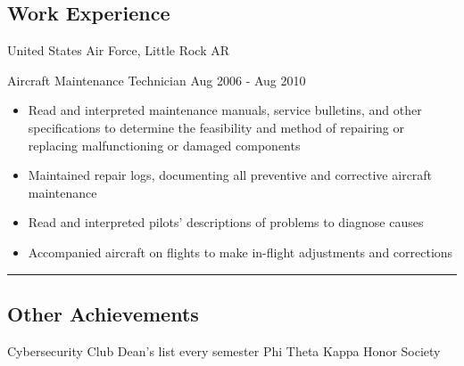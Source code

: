 \documentclass{article}
\begin{document}
\subsection*{Work Experience}
\hspace*{1.0in}United States Air Force, Little Rock AR \newline
\hspace*{1.0in}\begin{itshape}Aircraft Maintenance Technician \hfill Aug 2006 - Aug 2010 \end{itshape}
\begin{itemize}
\setlength{\itemsep}{1pt}
  \setlength{\parskip}{0pt}
  \setlength{\parsep}{0pt}
\setlength{\itemindent}{6em}
\item Read and interpreted maintenance manuals, service bulletins, and   other specifications to determine the 
\hspace*{0.9in}feasibility and method of repairing or replacing malfunctioning or damaged components
\item Maintained repair logs, documenting all preventive and corrective aircraft maintenance
\item Read and interpreted pilots’ descriptions of problems to diagnose causes
\item Accompanied aircraft on flights to make in-flight adjustments and corrections
\end{itemize}

\begin{center} \noindent\rule{14cm}{0.1pt} \end{center}

\subsection*{Other Achievements}
\hspace*{1.0in} Cybersecurity Club \hfill Dean's list every semester \hfill Phi Theta Kappa Honor Society \newline \newline
\end{document}
